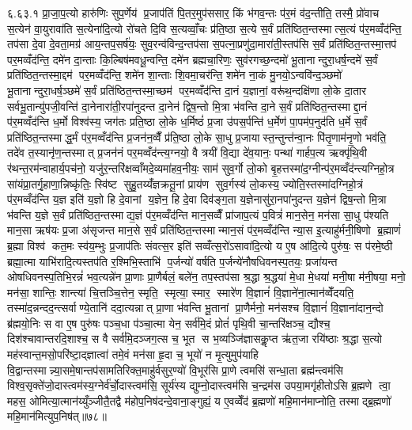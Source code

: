 ६.६३.१
प्रा॒जा॒प॒त्यो हारु॑णिः सुप॒र्णेय॑ प्र॒जाप॑तिं पि॒तर॒मुप॑ससार॒ किं भ॑गव॒न्तः प॑र॒मं व॑द॒न्तीति॒ तस्मै॒ प्रो॑वाच स॒त्येन॑ वा॒युरावा॑ति स॒त्येना॑दि॒त्यो रो॑चते दि॒वि स॒त्यव्वाँ॒चः प्र॑ति॒ष्ठा स॒त्ये स॒र्वं प्रति॑ष्ठित॒न्तस्मात्स॒त्यं प॑र॒मव्वँद॑न्ति॒ तप॑सा दे॒वा दे॒वता॒मग्र॑ आय॒न्तप॒सर्\mbox{}ष॑यः॒ सुव॒रन्व॑विन्द॒न्तप॑सा स॒पत्ना॒प्रणु॑दा॒मारा॑ती॒स्तप॑सि स॒र्वं प्रति॑ष्ठित॒न्तस्मा॒त्तप॑ पर॒मव्वँद॑न्ति॒ दमे॑न दा॒न्ताः कि॒ल्बिष॑मवधू॒न्वन्ति॒ दमे॑न ब्रह्मचा॒रिणः॒ सुव॑रगच्छ॒न्दमो॑ भू॒तानान्दुरा॒धर्\mbox{}ष॒न्दमे॑ स॒र्वं प्रति॑ष्ठित॒न्तस्मा॒द्दम॑ पर॒मव्वँद॑न्ति॒ शमे॑न शा॒न्ताः  शि॒वमा॒चर॑न्ति॒ शमे॑न ना॒कं मु॒नयो॒ऽन्ववि॑न्द॒ञ्छमो॑ भू॒तानान्दुरा॒धर्\mbox{}ष॒ञ्छमे॑ स॒र्वं प्रति॑ष्ठित॒न्तस्मा॒च्छम॑ पर॒मव्वँद॑न्ति दा॒नं य॒ज्ञानां॒ वरू॑थ॒न्दक्षि॑णा लो॒के दा॒तार सर्वभू॒तान्यु॑पजी॒वन्ति॑ दा॒नेनारा॑ती॒रपा॑नुदन्त दा॒नेन॑ द्विष॒न्तो मि॒त्रा भ॑वन्ति दा॒ने स॒र्वं प्रति॑ष्ठित॒न्तस्माद्दा॒नं प॑र॒मव्वँद॑न्ति ध॒र्मो विश्व॑स्य॒ जग॑तः प्रति॒ष्ठा लो॒के ध॒र्मिष्ठं॑ प्र॒जा उ॑पस॒र्पन्ति॑ ध॒र्मेण॑ पा॒पम॑प॒नुद॑ति ध॒र्मे स॒र्वं प्रति॑ष्ठित॒न्तस्माद्ध॒र्मं प॑र॒मव्वँद॑न्ति प्र॒जन॑न॒व्वैँ प्र॑ति॒ष्ठा लो॒के सा॒धु प्र॒जायास्त॒न्तुन्त॑न्वा॒नः पि॑तृ॒णाम॑नृ॒णो भव॑ति॒ तदे॑व त॒स्यानृ॑ण॒न्तस्मात् प्र॒जन॑नं पर॒मव्वँद॑न्त्य॒ग्नयो॒ वै त्रयी॑ वि॒द्या दे॑व॒यानः॒ पन्था॑ गार्\mbox{}हप॒त्य ऋक्पृ॑थि॒वी र॑थन्त॒रम॑न्वाहार्य॒पच॑नो॒ यजु॑र॒न्तरि॑क्षव्वाँमदे॒व्यमा॑हव॒नीयः॒ साम॑ सुव॒र्गो लो॒को बृ॒हत्तस्मा॑द॒ग्नीन्प॑र॒मव्वँद॑न्त्यग्निहो॒त्र सा॑यंप्रा॒तर्गृ॒हाणा॒न्निष्कृ॑तिः॒ स्वि॑ष्ट सुहु॒तय्यँ॑ज्ञक्रतू॒नां प्राय॑ण सुव॒र्गस्य॑ लो॒कस्य॒ ज्योति॒स्तस्मा॑दग्निहो॒त्रं प॑र॒मव्वँद॑न्ति य॒ज्ञ इति॑ य॒ज्ञो हि दे॒वानां य॒ज्ञेन॒ हि दे॒वा दिव॑ङ्ग॒ता य॒ज्ञेनासु॑रा॒नपा॑नुदन्त य॒ज्ञेन॑ द्विष॒न्तो मि॒त्रा भ॑वन्ति य॒ज्ञे स॒र्वं प्रति॑ष्ठित॒न्तस्माद्य॒ज्ञं प॑र॒मव्वँद॑न्ति मान॒सव्वैँ प्रा॑जाप॒त्यं प॒वित्रं॑ मान॒सेन॒ मन॑सा सा॒धु प॑श्यति मान॒सा ऋष॑यः प्र॒जा अ॑सृजन्त मान॒से स॒र्वं प्रति॑ष्ठित॒न्तस्मान्मान॒सं प॑र॒मव्वँद॑न्ति न्या॒स इ॒त्याहु॑र्मनी॒षिणो ब्र॒ह्माणं॑ ब्र॒ह्मा विश्व॑ कत॒मः स्व॑य॒म्भुः प्र॒जाप॑तिः संवत्स॒र इति॑ सव्वँत्स॒रो॑ऽसावा॑दि॒त्यो य ए॒ष आ॑दि॒त्ये पुरु॑षः॒ स प॑रमे॒ष्ठी ब्रह्मा॒त्मा याभि॑रादि॒त्यस्तप॑ति र॒श्मिभि॒स्ताभि॑ प॒र्जन्यो॑ वर्\mbox{}षति प॒र्जन्ये॑नौषधिवनस्प॒तयः॒ प्रजा॑यन्त ओषधिवनस्प॒तिभि॒रन्नं॑ भव॒त्यन्ने॑न प्रा॒णाः प्रा॒णैर्बलं॒ बले॑न॒ तप॒स्तप॑सा श्र॒द्धा श्र॒द्धया॑ मे॒धा मे॒धया॑ मनी॒षा म॑नी॒षया॒ मनो॒ मन॑सा॒ शान्तिः॒ शान्त्या॑ चि॒त्तञ्चि॒त्तेन॒ स्मृति॒ स्मृत्या॒ स्मार॒ स्मारे॑ण वि॒ज्ञानं॑  वि॒ज्ञाने॑ना॒त्मान॑व्वेँदयति॒ तस्मा॑द॒न्नन्दद॒न्त्सर्वाण्ये॒तानि॑ ददा॒त्यन्नात् प्रा॒णा भ॑वन्ति भू॒तानां प्रा॒णैर्मनो॒ मन॑सश्च वि॒ज्ञानं॑  वि॒ज्ञाना॑दान॒न्दो ब्र॑ह्मयो॒निः स वा ए॒ष पुरु॑षः पञ्च॒धा प॑ञ्चा॒त्मा येन॒ सर्व॑मि॒दं प्रोतं॑ पृथि॒वी चा॒न्तरि॑क्षञ्च॒ द्यौश्च॒ दिश॑श्चावान्तरदि॒शाश्च॒ स वै सर्व॑मि॒दञ्जग॒त्स च॒ भूत स भ॒व्यञ्जि॑ज्ञासकॢ॒प्त ऋ॑त॒जा रयि॑ष्ठाः  श्र॒द्धा स॒त्यो मह॑स्वान्त॒मसो॒परि॑ष्टा॒द्ज्ञात्वा॑ तमे॒वं मन॑सा हृ॒दा च॒ भूयो॑ न मृ॒त्युमुप॑याहि वि॒द्वान्तस्मान्न्या॒समे॒षान्तप॑सामतिरिक्त॒माहु॑र्वसुर॒ण्यो॑ वि॒भूर॑सि प्रा॒णे त्वमसि॑ सन्धा॒ता ब्रह्म॑न्त्वम॑सि विश्व॒सृक्ते॑जो॒दास्त्वम॑स्य॒ग्नेर्व॑र्चो॒दास्त्वम॑सि॒ सूर्य॑स्य द्युम्नो॒दास्त्वम॑सि च॒न्द्रम॑स उपया॒मगृ॑हीतोऽसि ब्र॒ह्मणे त्वा॒ महस॒ ओमित्या॒त्मान॑य्युँञ्जीतै॒तद्वै म॑होप॒निष॑दन्दे॒वाना॒ङ्गुह्यं॒ य ए॒वव्वेँद॑ ब्र॒ह्मणो॑ महि॒मान॑माप्नोति॒ तस्माद्ब्र॒ह्मणो॑ महि॒मान॑मित्युप॒निष॑त्॥७८॥
\anuvakamend

